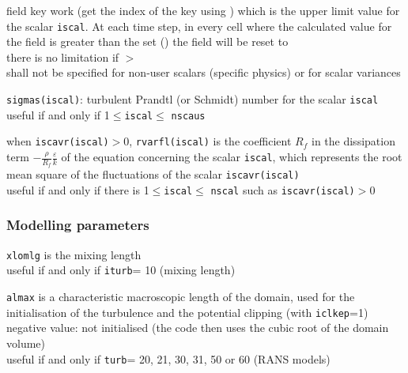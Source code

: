 {field key work (get the index of the key using
)
which is the upper limit value for the scalar {\tt iscal}. At each time step,
in every cell where the calculated value for the field 
is greater than the set 
()
the field will be reset to
\mbox{}\\
there is no limitation if $>$\\
 shall not be specified for non-user scalars (specific physics) or for
scalar variances
}

{{\tt sigmas(iscal)}: turbulent Prandtl (or Schmidt) number for the scalar
 {\tt iscal}\\
useful if and only if  1$\leqslant${\tt iscal}$\leqslant$ {\tt nscaus}}

{when {\tt iscavr(iscal)}$>$0, {\tt rvarfl(iscal)} is the coefficient $R_f$ in
the dissipation term $\displaystyle -\frac{\rho}{R_f}\frac{\varepsilon}{k}$
of the equation concerning the scalar {\tt iscal},
which represents the root mean square of the
fluctuations of the scalar {\tt iscavr(iscal)}\\
useful if and only if there is 1$\leqslant${\tt iscal}$\leqslant$ {\tt nscal} such as
 {\tt iscavr(iscal)}$>$0}


\subsubsection{Modelling parameters}

{{\tt xlomlg} is the mixing length\\
useful if and only if {\tt iturb}= 10 (mixing length)}

{{\tt almax} is a characteristic macroscopic
length of the domain, used for the initialisation of the turbulence and
the potential clipping (with {\tt iclkep}=1)\\
negative value: not initialised (the code then uses the cubic root of
the domain volume)\\
useful if and only if {\tt turb}= 20, 21, 30, 31, 50 or 60 (RANS models)}

